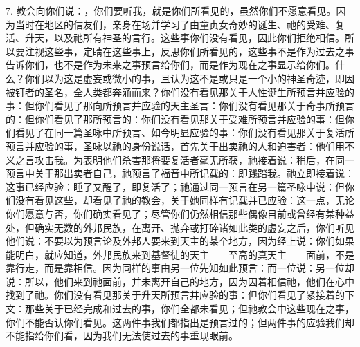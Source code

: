 7. 教会向你们说：，你们要听我，就是你们所看见的，虽然你们不愿意看见。因为当时在地区的信友们，亲身在场并学习了由童贞女奇妙的诞生、祂的受难、复活、升天，以及祂所有神圣的言行。这些事你们没有看见，因此你们拒绝相信。所以要注视这些事，定睛在这些事上，反思你们所看见的，这些事不是作为过去之事告诉你们，也不是作为未来之事预言给你们，而是作为现在之事显示给你们。什么？你们以为这是虚妄或微小的事，且认为这不是或只是一个小的神圣奇迹，即因被钉者的圣名，全人类都奔涌而来？你们没有看见那关于人性诞生所预言并应验的事：但你们看见了那向所预言并应验的天主圣言：你们没有看见那关于奇事所预言的：但你们看见了那所预言的：你们没有看见那关于受难所预言并应验的事：但你们看见了在同一篇圣咏中所预言、如今明显应验的事：你们没有看见那关于复活所预言并应验的事，圣咏以祂的身份说话，首先关于出卖祂的人和迫害者：他们用不义之言攻击我。为表明他们杀害那将要复活者毫无所获，祂接着说：稍后，在同一预言中关于那出卖者自己，祂预言了福音中所记载的：即践踏我。祂立即接着说：这事已经应验：睡了又醒了，即复活了；祂通过同一预言在另一篇圣咏中说：但你们没有看见这些，却看见了祂的教会，关于她同样有记载并已应验：这一点，无论你们愿意与否，你们确实看见了；尽管你们仍然相信那些偶像目前或曾经有某种益处，但确实无数的外邦民族，在离开、抛弃或打碎诸如此类的虚妄之后，你们听见他们说：不要以为预言论及外邦人要来到天主的某个地方，因为经上说：你们如果能明白，就应知道，外邦民族来到基督徒的天主——至高的真天主——面前，不是靠行走，而是靠相信。因为同样的事由另一位先知如此预言：而一位说：另一位却说：所以，他们来到祂面前，并未离开自己的地方，因为因着相信祂，他们在心中找到了祂。你们没有看见那关于升天所预言并应验的事：但你们看见了紧接着的下文：那些关于已经完成和过去的事，你们全都未看见；但祂教会中这些现在之事，你们不能否认你们看见。这两件事我们都指出是预言过的；但两件事的应验我们却不能指给你们看，因为我们无法使过去的事重现眼前。\par

